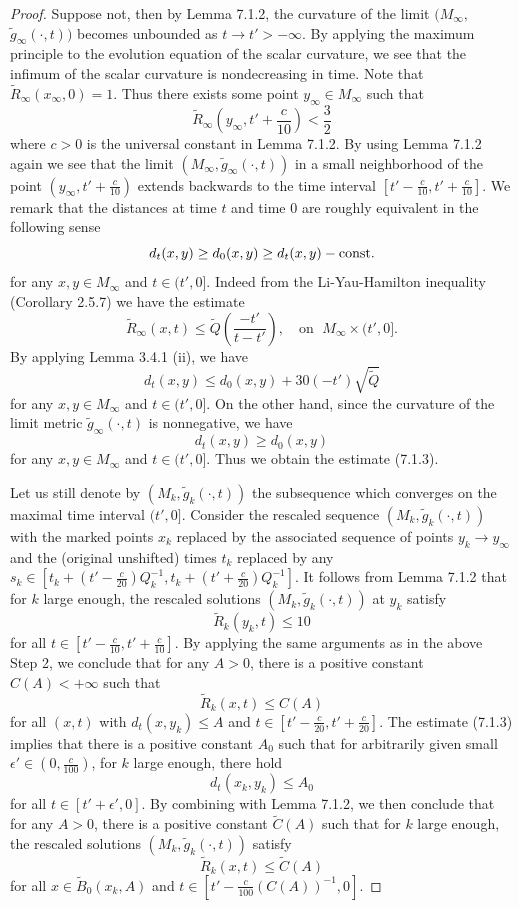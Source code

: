 \begin{proof}
Suppose not, then by Lemma 7.1.2, the curvature of the limit
$(M_{\infty},$ $\tilde{g}_{\infty}(\cdot,t))$ becomes unbounded as
$t\rightarrow t'>-\infty$. By applying the maximum principle to
the evolution equation of the scalar curvature, we see that the
infimum of the scalar curvature is nondecreasing in time. Note
that $\tilde{R}_{\infty}(x_{\infty},0) =1$. Thus there exists some
point $y_{\infty}\in M_{\infty}$ such that
$$
\tilde{R}_{\infty}\left(y_{\infty},t'+\frac{c}{10}\right)<\frac{3}{2}
$$
where $c>0$ is the universal constant in Lemma 7.1.2. By using
Lemma 7.1.2 again we see that the limit
$(M_{\infty},\tilde{g}_{\infty}(\cdot,t))$ in a small neighborhood
of the point $(y_{\infty},t'+\frac{c}{10})$ extends backwards to
the time interval $[t'-\frac{c}{10},t'+\frac{c}{10}]$. We remark
that the distances at time $t$ and time $0$ are roughly equivalent
in the following sense \begin{equation}
d_t(x,y) \geq d_0(x,y) \geq d_t(x,y)-{\rm const.}  %
\end{equation} for any $x,y \in M_{\infty}$ and $t \in (t',0]$. Indeed from
the Li-Yau-Hamilton inequality (Corollary 2.5.7) we have the
estimate
$$
\tilde{R}_\infty(x,t) \le \tilde{Q}\left(\frac{-t'}{t-t'}\right),\quad
\mbox{on }\; M_\infty\times(t',0].
$$
By applying Lemma 3.4.1 (ii), we have
$$
d_t(x,y)\le d_0(x,y)+30(-t')\sqrt{\tilde{Q}}
$$
for any $x,y\in M_\infty$ and $t\in(t',0]$. On the other hand,
since the curvature of the limit metric
$\tilde{g}_\infty(\cdot,t)$ is nonnegative, we have
$$
d_t(x,y)\ge d_0(x,y)
$$
for any $x,y\in M_\infty$ and $t\in(t',0]$. Thus we obtain the
estimate (7.1.3).

Let us still denote by $(M_k,\tilde{g}_k(\cdot,t))$ the
subsequence which converges on the maximal time interval
$(t'\!,0]$. Consider the rescaled sequence
$(\!M_k,\tilde{g}_k(\cdot,t))$ with the marked points $x_k$
replaced by the associated sequence of points $y_k \rightarrow
y_{\infty}$ and the (original unshifted) times $t_k$ replaced by
any $s_k \in
[t_k+(t'-\frac{c}{20})Q_k^{-1},t_k+(t'+\frac{c}{20})Q_k^{-1}]$. It
follows from Lemma 7.1.2 that for $k$ large enough, the rescaled
solutions $(M_k,\tilde{g}_k(\cdot,t))$ at $y_k$ satisfy
$$
\tilde{R}_k(y_k,t) \leq 10
$$
for all $t \in [t'-\frac{c}{10},t'+\frac{c}{10}]$. By applying the
same arguments as in the above Step 2, we conclude that for any $A
> 0$, there is a positive constant $C(A)<+\infty$ such that
$$
\tilde{R}_k(x,t) \leq C(A)
$$
for all $(x,t)$ with ${d}_t(x,y_k) \leq A$ and $t \in
[t'-\frac{c}{20},t'+\frac{c}{20}]$. The estimate (7.1.3) implies
that there is a positive constant $A_0$ such that for arbitrarily
given small $\epsilon' \in(0,\frac{c}{100})$, for $k$ large
enough, there hold
$$
{d}_t(x_k,y_k) \leq A_0
$$
for all $t \in [t'+ \epsilon',0]$. By combining with Lemma 7.1.2,
we then conclude that for any $A>0$, there is a positive constant
$\tilde{C}(A)$ such that for $k$ large enough, the rescaled
solutions $(M_k,\tilde{g}_k(\cdot,t))$ satisfy
$$
\tilde{R}_k(x,t) \leq \tilde{C}(A)
$$
for all $x \in \tilde{B}_0(x_k,A)$ and $t \in [t' -
\frac{c}{100}(C(A))^{-1},0]$.


\end{proof}
